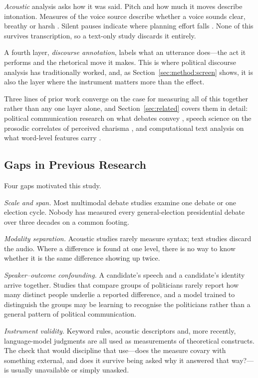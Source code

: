 \documentclass[journal]{IEEEtran}
\begin{document}
\emph{Acoustic} analysis asks how it was said. Pitch and how much it moves
describe intonation. Measures of the voice source describe whether a voice
sounds clear, breathy or harsh \cite{laver1980voice}. Silent pauses indicate
where planning effort falls \cite{goldman1968psycholinguistics,levelt1989speaking}.
None of this survives transcription, so a text-only study discards it
entirely.

A fourth layer, \emph{discourse annotation}, labels what an utterance
does---the act it performs and the rhetorical move it makes. This is where
political discourse analysis has traditionally worked, and, as
Section~\ref{sec:method:screen} shows, it is also the layer where the
instrument matters more than the effect.

Three lines of prior work converge on the case for measuring all of this
together rather than any one layer alone, and Section~\ref{sec:related}
covers them in detail: political communication research on what debates
convey \cite{benoit2014debates}, speech science on the prosodic correlates of
perceived charisma \cite{rosenberg2009acoustic,hutto2018political}, and
computational text analysis on what word-level features carry
\cite{tausczik2010psychological,pennebaker2014small}.

\subsection{Gaps in Previous Research}
\label{sec:intro:gaps}

Four gaps motivated this study.

\emph{Scale and span.} Most multimodal debate studies examine one debate or
one election cycle. Nobody has measured every general-election presidential
debate over three decades on a common footing.

\emph{Modality separation.} Acoustic studies rarely measure syntax; text
studies discard the audio. Where a difference is found at one level, there is
no way to know whether it is the same difference showing up twice.

\emph{Speaker--outcome confounding.} A candidate's speech and a candidate's
identity arrive together. Studies that compare groups of politicians rarely
report how many distinct people underlie a reported difference, and a model
trained to distinguish the groups may be learning to recognise the
politicians rather than a general pattern of political communication.

\emph{Instrument validity.} Keyword rules, acoustic descriptors and, more
recently, language-model judgments are all used as measurements of
theoretical constructs. The check that would discipline that use---does the
measure covary with something external, and does it survive being asked why
it answered that way?---is usually unavailable or simply unasked.
\end{document}
